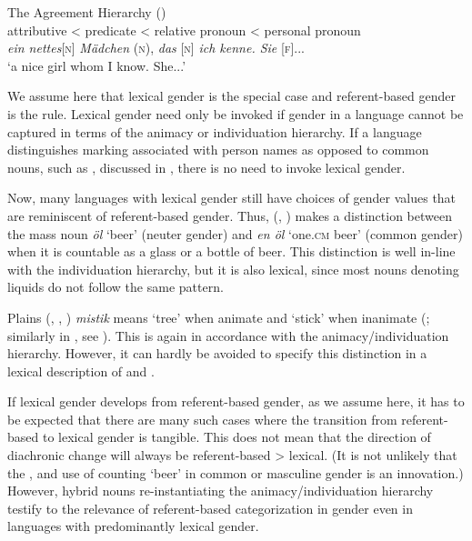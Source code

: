 \documentclass[output=collectionpaper]{langsci/langscibook}
\begin{document}
\ea\label{ex:WDG:15}
The Agreement Hierarchy (\citealt[226]{Corbett1991})\\
attributive < predicate < relative pronoun < personal pronoun\\
\textit{ein nettes}[\textsc{n}] \textit{Mädchen} (\textsc{n}), \textit{das} [\textsc{n}] \textit{ich kenne. Sie} [\textsc{f}]...\\
`a nice girl whom I know. She...'\\
\z

We assume here that lexical gender is the special case and referent-based gender is the rule. Lexical gender need only be invoked if gender in a language cannot be captured in terms of the animacy or individuation hierarchy. If a language distinguishes marking associated with person names as opposed to common nouns, such as , discussed in , there is no need to invoke lexical gender.

Now, many languages with lexical gender still have choices of gender values that are reminiscent of referent-based gender. Thus,  (, ) makes a distinction between the mass noun \textit{öl} `beer' (neuter gender) and \textit{en öl} `one.\textsc{cm} beer' (common gender) when it is countable as a glass or a bottle of beer. This distinction is well in-line with the individuation hierarchy, but it is also lexical, since most  nouns denoting liquids do not follow the same pattern.

Plains  (, , ) \textit{mistik} means `tree' when animate and `stick' when inanimate (\citealt[22]{Wolfart1973}; similarly in , see \citealt[128]{Straus1982}). This is again in accordance with the animacy/individuation hierarchy. However, it can hardly be avoided to specify this distinction in a lexical description of  and .

If lexical gender develops from referent-based gender, as we assume here, it has to be expected that there are many such cases where the transition from referent-based to lexical gender is tangible. This does not mean that the direction of diachronic change will always be referent-based > lexical. (It is not unlikely that the ,  and  use of counting `beer' in common \textendash{} or masculine \textendash{} gender is an innovation.) However, hybrid nouns re-instantiating the animacy/individuation hierarchy testify to the relevance of referent-based categorization in gender even in languages with predominantly lexical gender.
\end{document}
